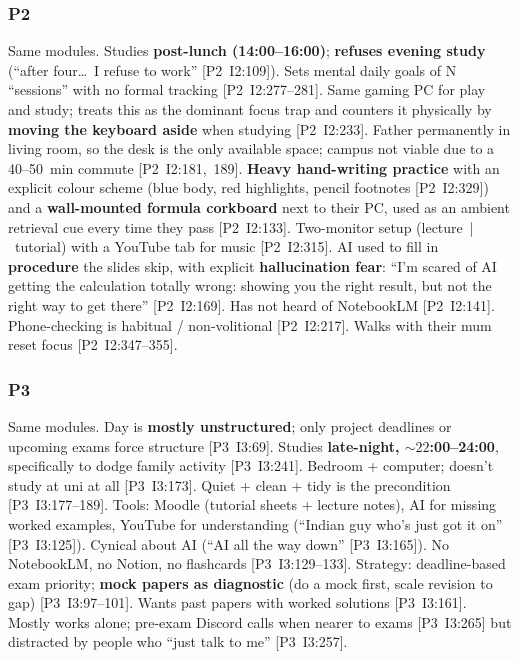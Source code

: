 \documentclass[a4paper,11pt]{article}
\begin{document}
\subsubsection*{P2}
Same modules. Studies \textbf{post-lunch (14:00--16:00)};
\textbf{refuses evening study} (``after four\dots\ I refuse to work''
[P2~I2:109]). Sets mental daily goals of N ``sessions'' with no formal
tracking [P2~I2:277--281]. Same gaming PC for play and study; treats
this as the dominant focus trap and counters it physically by
\textbf{moving the keyboard aside} when studying [P2~I2:233]. Father
permanently in living room, so the desk is the only available space;
campus not viable due to a 40--50~min commute
[P2~I2:181,~189]. \textbf{Heavy hand-writing practice} with an explicit
colour scheme (blue body, red highlights, pencil footnotes
[P2~I2:329]) and a \textbf{wall-mounted formula corkboard} next to their PC,
used as an ambient retrieval cue every time they pass
[P2~I2:133]. Two-monitor setup (lecture~|~tutorial) with a YouTube tab
for music [P2~I2:315]. AI used to fill in \textbf{procedure} the slides
skip, with explicit \textbf{hallucination fear}: ``I'm scared of AI
getting the calculation totally wrong: showing you the right result,
but not the right way to get there'' [P2~I2:169]. Has not heard of
NotebookLM [P2~I2:141]. Phone-checking is habitual / non-volitional
[P2~I2:217]. Walks with their mum reset focus [P2~I2:347--355].

\subsubsection*{P3}
Same modules. Day is \textbf{mostly unstructured}; only project
deadlines or upcoming exams force structure [P3~I3:69]. Studies
\textbf{late-night, ${\sim}22$:00--24:00}, specifically to dodge family
activity [P3~I3:241]. Bedroom + computer; doesn't study at uni at all
[P3~I3:173]. Quiet + clean + tidy is the precondition
[P3~I3:177--189]. Tools: Moodle (tutorial sheets + lecture notes), AI
for missing worked examples, YouTube for understanding (``Indian guy
who's just got it on'' [P3~I3:125]). Cynical about AI (``AI all the way
down'' [P3~I3:165]). No NotebookLM, no Notion, no flashcards
[P3~I3:129--133]. Strategy: deadline-based exam priority; \textbf{mock
papers as diagnostic} (do a mock first, scale revision to gap)
[P3~I3:97--101]. Wants past papers with worked solutions
[P3~I3:161]. Mostly works alone; pre-exam Discord calls when nearer to
exams [P3~I3:265] but distracted by people who ``just talk to me''
[P3~I3:257].
\end{document}
